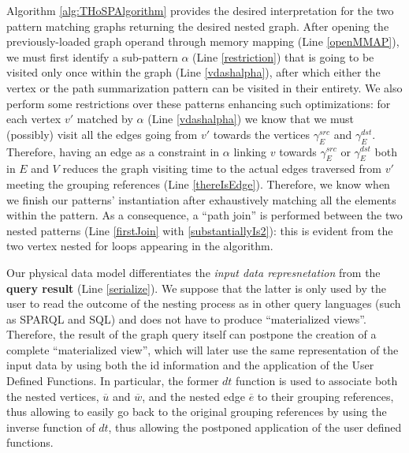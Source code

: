 Algorithm \ref{alg:THoSPAlgorithm} provides the desired interpretation for the two pattern matching graphs returning the desired nested graph. 
 After opening the previously-loaded graph operand through memory mapping (Line \ref{openMMAP}), we must first identify a sub-pattern $\alpha$ (Line \ref{restriction}) that is going to be visited only once within the graph (Line \ref{vdashalpha}), after which either the vertex or the path summarization pattern can be visited in their entirety. We also perform some restrictions over these patterns enhancing such optimizations: for each vertex $v'$ matched by $\alpha$ (Line \ref{vdashalpha}) we know that we must (possibly) visit all the edges going from $v'$ towards the vertices $\gamma_E^{src}$ and $\gamma_E^{dst}$.  Therefore, having an edge as a constraint in $\alpha$ linking $v$ towards $\gamma_E^{src}$ or $\gamma_E^{dst}$ both in $E$ and $V$  reduces the graph visiting time to the actual edges traversed from $v'$ meeting the grouping references (Line \ref{thereIsEdge}). Therefore, we know when we finish  our patterns' instantiation after exhaustively matching all the elements within the pattern.
As a consequence, a ``path join'' is performed between the two nested patterns (Line \ref{firstJoin} with \ref{substantiallyIs2}): this is evident from the two vertex nested for loops appearing in the algorithm.  %



Our physical data model differentiates the \textit{input data  represnetation} from the \textbf{query result} (Line \ref{serialize}). 
We suppose that the latter is only used by the user to read the outcome of the nesting process as in other  query languages (such as SPARQL and SQL) and does not have to
produce ``materialized views''. Therefore, the result of the graph query itself can postpone the creation of a complete ``materialized view'', which will later use the same representation of the input data by using both the id information and the application of the User Defined Functions. In particular, the former $dt$ function is used to associate both the nested vertices, $\overline{u}$ and $\overline{w}$, and the nested edge $\overline{e}$ to their grouping references, thus allowing to easily go back to the original grouping references by using the inverse function of $dt$, thus allowing the postponed application of the user defined functions.


